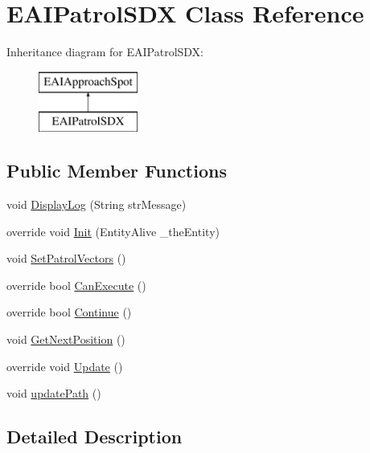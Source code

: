 \hypertarget{class_e_a_i_patrol_s_d_x}{}\section{E\+A\+I\+Patrol\+S\+DX Class Reference}
\label{class_e_a_i_patrol_s_d_x}
Inheritance diagram for E\+A\+I\+Patrol\+S\+DX\+:\begin{figure}[H]
\begin{center}
\leavevmode
\includegraphics[height=2.000000cm]{class_e_a_i_patrol_s_d_x}
\end{center}
\end{figure}
\subsection*{Public Member Functions}
\begin{DoxyCompactItemize}
\item 
void \mbox{\hyperlink{class_e_a_i_patrol_s_d_x_a52cbc47fa43745d8429bfc1e96635103}{Display\+Log}} (String str\+Message)
\item 
override void \mbox{\hyperlink{class_e_a_i_patrol_s_d_x_a0b9c075e2bbbdeec6795454373e5f9ff}{Init}} (Entity\+Alive \+\_\+the\+Entity)
\item 
void \mbox{\hyperlink{class_e_a_i_patrol_s_d_x_a43dbbcac3d5d87e72ebd8e064ff18b0e}{Set\+Patrol\+Vectors}} ()
\item 
override bool \mbox{\hyperlink{class_e_a_i_patrol_s_d_x_a9039242e863a0e5a0381c01d4204487f}{Can\+Execute}} ()
\item 
override bool \mbox{\hyperlink{class_e_a_i_patrol_s_d_x_a1adab2eea226eb846a0fe918e9032fcf}{Continue}} ()
\item 
void \mbox{\hyperlink{class_e_a_i_patrol_s_d_x_a86fefa31acd885849b189ec650c86416}{Get\+Next\+Position}} ()
\item 
override void \mbox{\hyperlink{class_e_a_i_patrol_s_d_x_a2f5d21b77a20f5d874360967ab33bfe8}{Update}} ()
\item 
void \mbox{\hyperlink{class_e_a_i_patrol_s_d_x_a5772708c95969db9a421148b7b3ac1e3}{update\+Path}} ()
\end{DoxyCompactItemize}


\subsection{Detailed Description}


